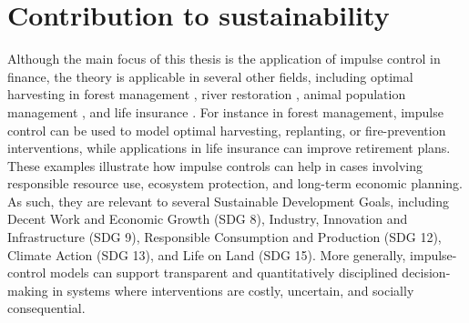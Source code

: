 \section*{Contribution to sustainability}
Although the main focus of this thesis is the application of impulse control in finance, the theory is applicable in several other fields, including optimal harvesting in forest management \cite{ieda2015implicit}, river restoration \cite{YOSHIOKA20192182}, animal population management \cite{yaegashi2019exact}, and life insurance \cite{azimzadeh2018impulsecontrolfinancenumerical, lu2024semi}. For instance in forest management, impulse control can be used to model optimal harvesting, replanting, or fire-prevention interventions, while applications in life insurance can improve retirement plans. These examples illustrate how impulse controls can help in cases involving responsible resource use, ecosystem protection, and long-term economic planning. As such, they are relevant to several Sustainable Development Goals, including Decent Work and Economic Growth (SDG 8), Industry, Innovation and Infrastructure (SDG 9), Responsible Consumption and Production (SDG 12), Climate Action (SDG 13), and Life on Land (SDG 15). More generally, impulse-control models can support transparent and quantitatively disciplined decision-making in systems where interventions are costly, uncertain, and socially consequential.


